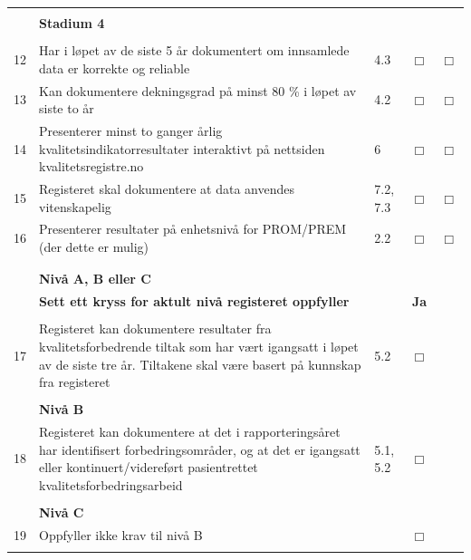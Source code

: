 \documentclass{article}
\newcommand{\tomboks}{
    $\Box$
}
\begin{document}
\begin{centering}
\begin{longtable}{l p{} l c c}
        & & & & \\
        & \textbf{Stadium 4} & & & \\
        & & & & \\
        12 & Har i løpet av de siste 5 år dokumentert om innsamlede data er korrekte og reliable & 4.3 & \tomboks & \tomboks \\
        13 & Kan dokumentere dekningsgrad på minst 80 \% i løpet av siste to år & 4.2 & \tomboks & \tomboks \\
        14 & Presenterer minst to ganger årlig kvalitetsindikatorresultater interaktivt på nettsiden kvalitetsregistre.no & 6 & \tomboks & \tomboks \\
        15 & Registeret skal dokumentere at data anvendes vitenskapelig & 7.2, 7.3 & \tomboks & \tomboks \\
        16 & Presenterer resultater på enhetsnivå for PROM/PREM (der dette er mulig) & 2.2 & \tomboks & \tomboks \\
        & & & & \\
        & & & & \\
        & \textbf{Nivå A, B eller C} & & & \\
        & \textbf{Sett ett kryss for aktult nivå registeret oppfyller} & & \textbf{Ja} & \\
        & & & & \\
        17 & Registeret kan dokumentere resultater fra kvalitetsforbedrende tiltak som har vært igangsatt i løpet av de siste tre år. Tiltakene skal være basert på kunnskap fra registeret & 5.2 & \tomboks & \\
        & & & & \\
        & \textbf{Nivå B} & & & \\
        18 & Registeret kan dokumentere at det i rapporteringsåret har identifisert forbedringsområder, og at det er igangsatt eller kontinuert/videreført pasientrettet kvalitetsforbedringsarbeid & 5.1, 5.2 & \tomboks & \\
        & & & & \\
        & \textbf{Nivå C} & & & \\
        19 & Oppfyller ikke krav til nivå B & & \tomboks & \\
        & & & & \\
        \hline \hline
        
        \end{longtable}
    \end{centering}
    
    \newpage
    
\end{document}
